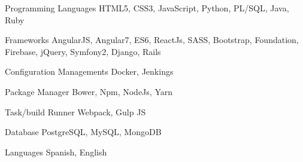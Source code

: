 


\begin{cvskills}


\cvskill
{Programming Languages} %
{HTML5, CSS3, JavaScript, Python, PL/SQL, Java, Ruby} %


\cvskill
{Frameworks} %
{AngularJS, Angular7, ES6, ReactJs, SASS, Bootstrap, Foundation, Firebase, jQuery, Symfony2, Django, Rails } %


\cvskill
{Configuration Managements} %
{Docker, Jenkings} %


\cvskill
{Package Manager} %
{Bower, Npm, NodeJs, Yarn} %


\cvskill
{Task/build Runner } %
{Webpack, Gulp JS} %


\cvskill
{Database} %
{PostgreSQL, MySQL, MongoDB} %


\cvskill
{Languages} %
{Spanish, English} %




\end{cvskills}

